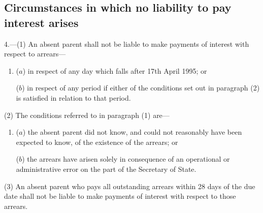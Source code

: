\documentclass[12pt,a4paper]{article}
\begin{document}

\subsection[4. Circumstances in which no liability to pay interest arises]{Circumstances in which no liability to pay interest arises}

4.—(1) An absent parent shall not be liable to make payments of interest 
with respect to arrears—
\begin{enumerate}\item[]
($a$) in respect of any day which falls after 17th April 1995; or

($b$) in respect of any period if either of the conditions set out in paragraph (2) is satisfied in relation to that period.
\end{enumerate}  %

(2) The conditions referred to in paragraph (1) are—
\begin{enumerate}\item[]
($a$) the absent parent did not know, and could not reasonably have been expected to know, of the existence of the arrears; or

($b$) the arrears have arisen solely in consequence of an operational or administrative error on the part of the Secretary of State. 
\end{enumerate}

(3) An absent parent who pays all outstanding arrears 
within 28 days of the due date shall not be liable to make payments of interest with respect to those arrears.

\end{document}
